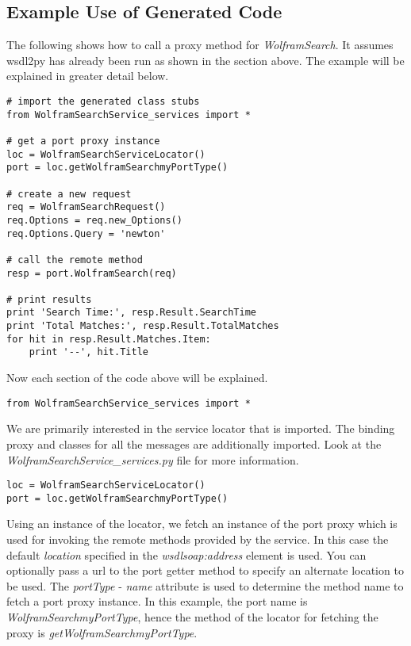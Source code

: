\subsection{Example Use of Generated Code}

The following shows how to call a proxy method for {\it WolframSearch}.  It
assumes wsdl2py has already been run as shown in the section above.  The example
will be explained in greater detail below.

\begin{verbatim}
# import the generated class stubs
from WolframSearchService_services import *

# get a port proxy instance
loc = WolframSearchServiceLocator()
port = loc.getWolframSearchmyPortType()

# create a new request
req = WolframSearchRequest()
req.Options = req.new_Options()
req.Options.Query = 'newton'

# call the remote method
resp = port.WolframSearch(req)

# print results
print 'Search Time:', resp.Result.SearchTime
print 'Total Matches:', resp.Result.TotalMatches
for hit in resp.Result.Matches.Item:
    print '--', hit.Title
\end{verbatim}

Now each section of the code above will be explained.

\begin{verbatim}
from WolframSearchService_services import *
\end{verbatim}

We are primarily interested in the service locator that is imported.  The 
binding proxy and classes for all the messages are additionally imported.
Look at the {\it WolframSearchService_services.py} file for more information.

\begin{verbatim}
loc = WolframSearchServiceLocator()
port = loc.getWolframSearchmyPortType()
\end{verbatim}

Using an instance of the locator, we fetch an instance of the port proxy
which is used for invoking the remote methods provided by the service.  In
this case the default {\it location} specified in the {\it wsdlsoap:address}
element is used.  You can optionally pass a url to the port getter method to
specify an alternate location to be used.  The {\it portType} - {\it name} 
attribute is used to determine the method name to fetch a port proxy instance.
In this example, the port name is {\it WolframSearchmyPortType}, hence the 
method of the locator for fetching the proxy is {\it getWolframSearchmyPortType}.

